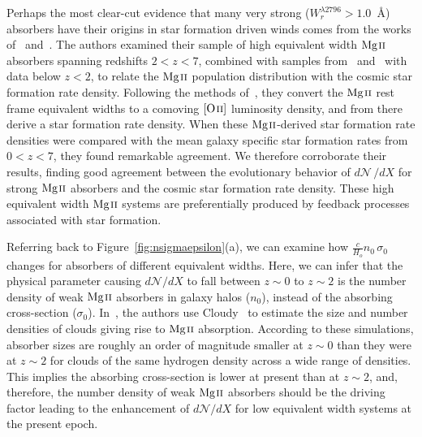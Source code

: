 Perhaps the most clear-cut evidence that many very strong ($W_r^{\lambda2796} > 1.0$~{\AA}) absorbers have their origins in star formation driven winds comes from the works of~\cite{Matejek2012} and~\cite{Chen2016}. The authors examined their sample of high equivalent width ${\hbox{{\rm Mg}\kern 0.1em{\sc ii}}}$ absorbers spanning redshifts $2 < z < 7$, combined with samples from~\cite{Nestor2005} and~\cite{Prochter2006} with data below $z < 2$, to relate the ${\hbox{{\rm Mg}\kern 0.1em{\sc ii}}}$ population distribution with the cosmic star formation rate density. Following the methods of~\cite{Menard2011}, they convert the ${\hbox{{\rm Mg}\kern 0.1em{\sc ii}}}$ rest frame equivalent widths to a comoving ${\hbox{[{\rm O}\kern 0.1em{\sc ii}]}}$ luminosity density, and from there derive a star formation rate density. When these ${\hbox{{\rm Mg}\kern 0.1em{\sc ii}}}$-derived star formation rate densities were compared with the mean galaxy specific star formation rates from $0 < z < 7$, they found remarkable agreement. We therefore corroborate their results, finding good agreement between the evolutionary behavior of $d\mathcal{N}\,/dX$ for strong ${\hbox{{\rm Mg}\kern 0.1em{\sc ii}}}$ absorbers and the cosmic star formation rate density. These high equivalent width ${\hbox{{\rm Mg}\kern 0.1em{\sc ii}}}$ systems are preferentially produced by feedback processes associated with star formation.

Referring back to Figure~\ref{fig:nsigmaepsilon}(a), we can examine how $\frac{c}{H_o}n_0\,\sigma_0$ changes for absorbers of different equivalent widths. Here, we can infer that the physical parameter causing $d\mathcal{N}\!/dX$ to fall between $z \sim 0$ to $z \sim 2$ is the number density of weak ${\hbox{{\rm Mg}\kern 0.1em{\sc ii}}}$ absorbers in galaxy halos ($n_0$), instead of the absorbing cross-section ($\sigma_0$). In~\cite{Evans2013}, the authors use Cloudy~\citep{Ferland2013} to estimate the size and number densities of clouds giving rise to ${\hbox{{\rm Mg}\kern 0.1em{\sc ii}}}$ absorption. According to these simulations, absorber sizes are roughly an order of magnitude smaller at $z \sim 0$ than they were at $z \sim 2$ for clouds of the same hydrogen density across a wide range of densities. This implies the absorbing cross-section is lower at present than at $z \sim 2$, and, therefore, the number density of weak ${\hbox{{\rm Mg}\kern 0.1em{\sc ii}}}$ absorbers should be the driving factor leading to the enhancement of $d\mathcal{N}\!/dX$ for low equivalent width systems at the present epoch.

